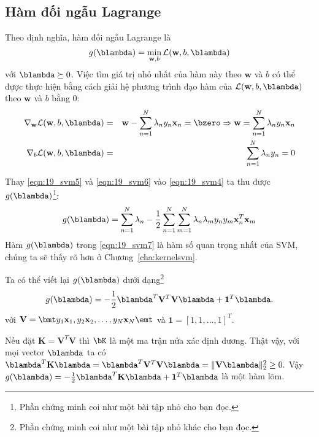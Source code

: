 \subsection{Hàm đối ngẫu Lagrange}
Theo định nghĩa, hàm đối ngẫu Lagrange là
\begin{equation*}
g(\blambda) = \min_{\mathbf{w}, b} \mathcal{L}(\mathbf{w}, b, \blambda)
\end{equation*}
với $\blambda \succeq 0$. Việc tìm giá trị nhỏ nhất của hàm này theo $\mathbf{w}$
và $b$ có thể đựợc thực hiện bằng cách giải hệ phương trình đạo hàm của $\mathcal{L}(\mathbf{w}, b, \blambda)$ theo $\mathbf{w}$ và $b$ bằng 0:
\begin{eqnarray}
\label{eqn:19_svm5}
\nabla_{\mathbf{w}}\mathcal{L}(\mathbf{w}, b, \blambda) &=&
\mathbf{w} - \sum_{n=1}^N \lambda_n y_n \mathbf{x}_n = \bzero \Rightarrow
\mathbf{w} = \sum_{n=1}^N \lambda_n y_n \mathbf{x}_n \\\
\label{eqn:19_svm6}
\nabla_{b}\mathcal{L}(\mathbf{w}, b, \blambda) &=&
\sum_{n=1}^N \lambda_ny_n = 0
\end{eqnarray}

Thay \eqref{eqn:19_svm5} và \eqref{eqn:19_svm6} vào \eqref{eqn:19_svm4} ta thu
được $g(\blambda)$\footnote{Phần chứng minh coi như một bài tập nhỏ cho bạn
đọc.}:
\begin{equation}
\label{eqn:19_svm7}
g(\blambda) = \sum_{n=1}^N \lambda_n  -\frac{1}{2}\sum_{n=1}^N \sum_{m=1}^N \lambda_n\lambda_m y_n y_m \mathbf{x}_n^T\mathbf{x}_m
\end{equation}
Hàm $g(\blambda)$ trong \eqref{eqn:19_svm7} {là hàm số quan trọng nhất
của SVM}, chúng ta sẽ thấy rõ hơn ở Chương~\ref{cha:kernelsvm}.


Ta có thể viết lại $g(\blambda)$
dưới dạng\footnote{Phần chứng minh coi như một bài tập nhỏ khác cho bạn đọc.}
\begin{equation}
\label{eqn:19_svm8}
g(\blambda) = -\frac{1}{2}\blambda^T\mathbf{V}^T\mathbf{V}\mathbf{\blambda} + \mathbf{1}^T\blambda.
\end{equation}
với
\begin{math}
\mathbf{V} = \bmt y_1 \mathbf{x}_1, y_2 \mathbf{x}_2, \dots, y_N \mathbf{x}_N \emt
\end{math}
và $\mathbf{1} = [1, 1, \dots, 1]^T$.

Nếu đặt $\mathbf{K} = \mathbf{V}^T\mathbf{V}$ thì $\bK$ là một ma trận nửa xác
định dương. Thật vậy, với mọi vector $\blambda$ ta có $\blambda^T\mathbf{K}\mathbf{\blambda} = \blambda^T\mathbf{V}^T\mathbf{V}\mathbf{\blambda} = \|\mathbf{V}\blambda\|_2^2 \geq 0.$
Vậy $g(\blambda) = -\frac{1}{2}\blambda^T\mathbf{K}\mathbf{\blambda} + \mathbf{1}^T\blambda$ là một hàm lõm.




